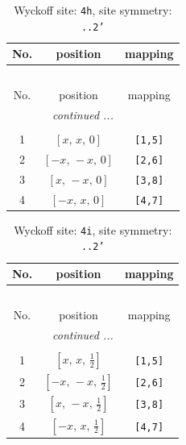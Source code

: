 \documentclass[fleqn,8pt]{jsarticle}
\begin{document}
\begin{longtable}{ccc}
\caption{Wyckoff site: {\tt 4h}, site symmetry: {\tt ..2'}}
 \\
 \hline \hline
No. & position & mapping \\ \hline \endfirsthead

\multicolumn{2}{l}{\tablename\ \thetable{}} \\
 \hline \hline
No. & position & mapping \\ \hline \endhead

 \hline \hline
\multicolumn{2}{r}{\footnotesize\it continued ...} \\ \endfoot

 \hline \hline
\multicolumn{2}{r}{} \\ \endlastfoot

1 & $\left[ x,\, x,\, 0 \right]$ & {\tt [1,5]} \\ \hline
2 & $\left[ - x,\, - x,\, 0 \right]$ & {\tt [2,6]} \\ \hline
3 & $\left[ x,\, - x,\, 0 \right]$ & {\tt [3,8]} \\ \hline
4 & $\left[ - x,\, x,\, 0 \right]$ & {\tt [4,7]} \\
\end{longtable}
\renewcommand{\arraystretch}{1.2}
\begin{longtable}{ccc}
\caption{Wyckoff site: {\tt 4i}, site symmetry: {\tt ..2'}}
 \\
 \hline \hline
No. & position & mapping \\ \hline \endfirsthead

\multicolumn{2}{l}{\tablename\ \thetable{}} \\
 \hline \hline
No. & position & mapping \\ \hline \endhead

 \hline \hline
\multicolumn{2}{r}{\footnotesize\it continued ...} \\ \endfoot

 \hline \hline
\multicolumn{2}{r}{} \\ \endlastfoot

1 & $\left[ x,\, x,\, \frac{1}{2} \right]$ & {\tt [1,5]} \\ \hline
2 & $\left[ - x,\, - x,\, \frac{1}{2} \right]$ & {\tt [2,6]} \\ \hline
3 & $\left[ x,\, - x,\, \frac{1}{2} \right]$ & {\tt [3,8]} \\ \hline
4 & $\left[ - x,\, x,\, \frac{1}{2} \right]$ & {\tt [4,7]} \\
\end{longtable}
\end{document}
